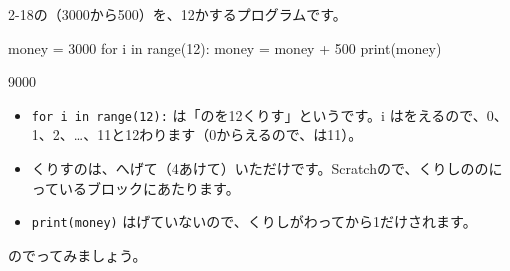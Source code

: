 
\leavevmode\label{bk:2-19:kurikaesi}2-18の（3000から500）を、12かするプログラムです。

\noindent\begin{minipage}[c]{0.45\linewidth}\centering
{}
\end{minipage}\hfill
\begin{minipage}[c]{0.52\linewidth}
\begin{bkiitcode}
money = 3000
for i in range(12):
    money = money + 500
print(money)
\end{bkiitcode}
\begin{bkiitout}
9000
\end{bkiitout}
\end{minipage}

\par\addvspace{4pt}
\begin{itemize}[leftmargin=1.2\zw, itemsep=1pt, topsep=2pt, label={\color{bkTheme}●}]
\item \texttt{for i in range(12):} は「のを12くりす」というです。i はをえるので、0、1、2、…、11と12わります（0からえるので、は11）。
\item くりすのは、へげて（4あけて）いただけです。Scratchので、くりしののにっているブロックにあたります。
\item \texttt{print(money)} はげていないので、くりしがわってから1だけされます。
\end{itemize}

のでってみましょう。

